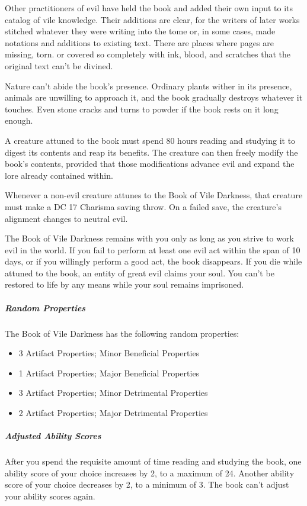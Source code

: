 \documentclass[10pt,a4paper,twoside,bg=print,twocolumn,openany,nodeprecatedcode]{dndarticle}
\begin{document}
Other practitioners of evil have held the book and added their own input to its catalog of vile knowledge. Their additions are clear, for the writers of later works stitched whatever they were writing into the tome or, in some cases, made notations and additions to existing text. There are places where pages are missing, torn. or covered so completely with ink, blood, and scratches that the original text can't be divined.

Nature can't abide the book's presence. Ordinary plants wither in its presence, animals are unwilling to approach it, and the book gradually destroys whatever it touches. Even stone cracks and turns to powder if the book rests on it long enough.

A creature attuned to the book must spend 80 hours reading and studying it to digest its contents and reap its benefits. The creature can then freely modify the book's contents, provided that those modifications advance evil and expand the lore already contained within.

Whenever a non-evil creature attunes to the Book of Vile Darkness, that creature must make a DC 17 Charisma saving throw. On a failed save, the creature's alignment changes to neutral evil.

The Book of Vile Darkness remains with you only as long as you strive to work evil in the world. If you fail to perform at least one evil act within the span of 10 days, or if you willingly perform a good act, the book disappears. If you die while attuned to the book, an entity of great evil claims your soul. You can't be restored to life by any means while your soul remains imprisoned.

\subparagraph{Random Properties}
The Book of Vile Darkness has the following random properties:


\begin{itemize}
\item 3 Artifact Properties; Minor Beneficial Properties
\item 1 Artifact Properties; Major Beneficial Properties
\item 3 Artifact Properties; Minor Detrimental Properties
\item 2 Artifact Properties; Major Detrimental Properties
\end{itemize}

\subparagraph{Adjusted Ability Scores}
After you spend the requisite amount of time reading and studying the book, one ability score of your choice increases by 2, to a maximum of 24. Another ability score of your choice decreases by 2, to a minimum of 3. The book can't adjust your ability scores again.
\end{document}
